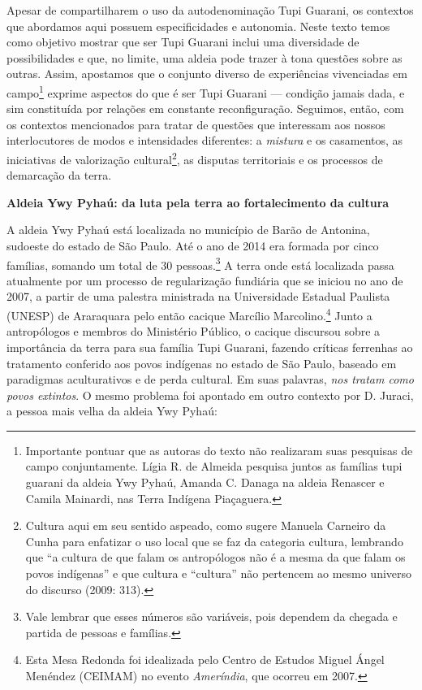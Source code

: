 Apesar de compartilharem o uso da autodenominação Tupi Guarani, os
contextos que abordamos aqui possuem especificidades e autonomia. Neste
texto temos como objetivo mostrar que ser Tupi Guarani inclui uma
diversidade de possibilidades e que, no limite, uma aldeia pode trazer à
tona questões sobre as outras. Assim, apostamos que o conjunto diverso
de experiências vivenciadas em campo\footnote{Importante pontuar que as
  autoras do texto não realizaram suas pesquisas de campo conjuntamente.
  Lígia R. de Almeida pesquisa juntos as famílias tupi guarani da aldeia
  Ywy Pyhaú, Amanda C. Danaga na aldeia Renascer e Camila Mainardi, nas
  Terra Indígena Piaçaguera.} exprime aspectos do que é ser Tupi Guarani
--- condição jamais dada, e sim constituída por relações em constante
reconfiguração. Seguimos, então, com os contextos mencionados para
tratar de questões que interessam aos nossos interlocutores de modos e
intensidades diferentes: a \emph{mistura} e os casamentos, as
iniciativas de valorização cultural\footnote{Cultura aqui em seu sentido
  aspeado, como sugere Manuela Carneiro da Cunha para enfatizar o uso
  local que se faz da categoria cultura, lembrando que ``a cultura de
  que falam os antropólogos não é a mesma da que falam os povos
  indígenas'' e que cultura e ``cultura'' não pertencem ao mesmo
  universo do discurso (2009: 313).}, as disputas territoriais e os
processos de demarcação da terra.

\textbf{Aldeia Ywy Pyhaú: da luta pela terra ao fortalecimento da
cultura}

A aldeia Ywy Pyhaú está localizada no município de Barão de Antonina,
sudoeste do estado de São Paulo. Até o ano de 2014 era formada por cinco
famílias, somando um total de 30 pessoas.\footnote{Vale lembrar que
  esses números são variáveis, pois dependem da chegada e partida de
  pessoas e famílias.} A terra onde está localizada passa atualmente por
um processo de regularização fundiária que se iniciou no ano de 2007, a
partir de uma palestra ministrada na Universidade Estadual Paulista
(UNESP) de Araraquara pelo então cacique Marcílio Marcolino.\footnote{Esta
  Mesa Redonda foi idealizada pelo Centro de Estudos Miguel Ángel
  Menéndez (CEIMAM) no evento \emph{Ameríndia}, que ocorreu em 2007.}
Junto a antropólogos e membros do Ministério Público, o cacique
discursou sobre a importância da terra para sua família Tupi Guarani,
fazendo críticas ferrenhas ao tratamento conferido aos povos indígenas
no estado de São Paulo, baseado em paradigmas aculturativos e de perda
cultural. Em suas palavras, \emph{nos tratam como povos extintos}. O
mesmo problema foi apontado em outro contexto por D. Juraci, a pessoa
mais velha da aldeia Ywy Pyhaú:

